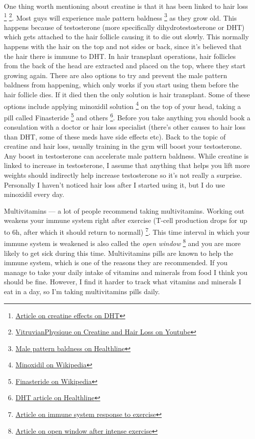 \documentclass[openany, 12pt]{book}
\begin{document}
        One thing worth mentioning about creatine is that it has been linked to hair loss
        \footnote{\href{https://pubmed.ncbi.nlm.nih.gov/19741313/}{Article on creatine effects on DHT}}
        \footnote{\href{https://www.youtube.com/watch?v=NgcfEMu_WSE}{VitruvianPhysique on Creatine and Hair Loss on Youtube}}.
        Most guys will experience male pattern baldness
        \footnote{\href{https://www.healthline.com/health/male-pattern-baldness}{Male pattern baldness on Healthline}} as they grow old. This happens because of testosterone (more specifically
        dihydrotestosterone or DHT) which gets attached to the hair follicle causing it to die out slowly. This normally happens with the hair on the top and not sides or back, since it's believed that
        the hair there is immune to DHT. In hair transplant operations, hair follicles from the back of the head are extracted and placed on the top, where they start growing again.
        There are also options to try and prevent the male pattern baldness from happening, which only works if you start using them before the hair follicle dies. If it died then 
        the only solution is hair transplant. Some of these options include applying minoxidil solution
        \footnote{\href{https://en.wikipedia.org/wiki/Minoxidil}{Minoxidil on Wikipedia}} on the top of your head, taking a pill called Finasteride
        \footnote{\href{https://en.wikipedia.org/wiki/Finasteride}{Finasteride on Wikipedia}} and others
        \footnote{\href{https://www.healthline.com/health/dht}{DHT article on Healthline}}. Before you take anything you should book a consulation with a doctor or hair loss specialist
        (there's other causes to hair loss than DHT, some of these meds have side effects etc).
        Back to the topic of creatine and hair loss, usually training in the gym will boost your testosterone. Any boost in testosterone can accelerate male pattern baldness. While creatine is linked
        to increase in testosterone, I assume that anything that helps you lift more weights should indirectly help increase testosterone so it's not really a surprise.
        Personally I haven't noticed hair loss after I started using it, but I do use minoxidil every day.

        Multivitamins --- a lot of people recommend taking multivitamins. Working out weakens your immune system right after exercise
        (T-cell production drops for up to 6h, after which it should return to normall)
        \footnote{\href{https://pubmed.ncbi.nlm.nih.gov/17037088/}{Article on immune system response to exercise}}.
        This time interval in which your immune system is weakened is also called the \textit{open window}
        \footnote{\href{https://pubmed.ncbi.nlm.nih.gov/20839496/}{Article on open window after intense exercise}} and you are more likely to get sick during this time.
        Multivitamins pills are known to help the immune system, which is one of the reasons they are recommended. If you manage to take your daily intake of vitamins and minerals from food I think
        you should be fine.
        However, I find it harder to track what vitamins and minerals I eat in a day, so I'm taking multivitamins pills daily.
\end{document}
